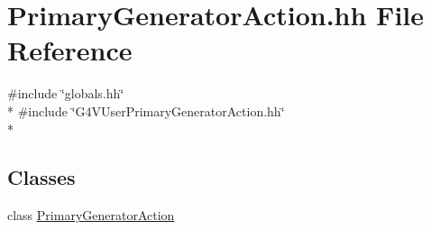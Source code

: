 \hypertarget{_primary_generator_action_8hh}{\section{Primary\-Generator\-Action.\-hh File Reference}
\label{_primary_generator_action_8hh}
}
{\ttfamily \#include \char`\"{}globals.\-hh\char`\"{}}\\*
{\ttfamily \#include \char`\"{}G4\-V\-User\-Primary\-Generator\-Action.\-hh\char`\"{}}\\*
\subsection*{Classes}
\begin{DoxyCompactItemize}
\item 
class \hyperlink{class_primary_generator_action}{Primary\-Generator\-Action}
\end{DoxyCompactItemize}

